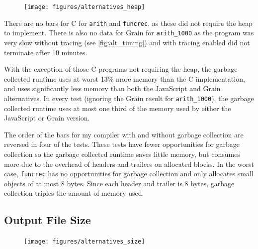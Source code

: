 \begin{figure}[H]
\hspace{-1cm}
\texttt{[image: figures/alternatives\_heap]}
 \label{fig:alt_heap} 
\end{figure}

There are no bars for C for \verb|arith| and \verb|funcrec|, as these did not require the heap to implement. 
There is also no data for Grain for \verb|arith_1000| as the program was very slow without tracing (see \ref{fig:alt_timing}) and with tracing enabled did not terminate after 10 minutes.

With the exception of those C programs not requiring the heap, the garbage collected runtime uses at worst 13\% more memory than the C implementation, and uses significantly less memory than both the JavaScript and Grain alternatives. In every test (ignoring the Grain result for \verb|arith_1000|), the garbage collected runtime uses at most one third of the memory used by either the JavaScript or Grain version. 

The order of the bars for my compiler with and without garbage collection are reversed in four of the tests. These tests have fewer opportunities for garbage collection so the garbage collected runtime saves little memory, but consumes more due to the overhead of headers and trailers on allocated blocks. In the worst case, \verb|funcrec| has no opportunities for garbage collection and only allocates small objects of at most 8 bytes. Since each header and trailer is 8 bytes, garbage collection triples the amount of memory used.



\subsection{Output File Size}

\begin{figure}[H]
\hspace{-1cm}
\texttt{[image: figures/alternatives\_size]}
 \label{fig:alt_size} 
\end{figure}

